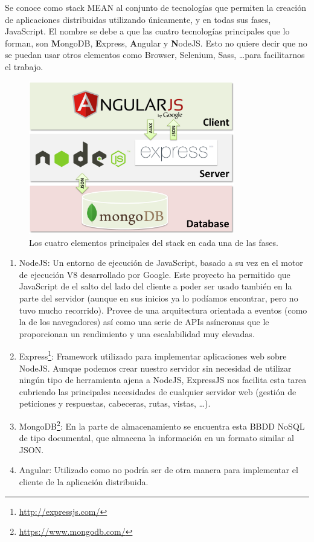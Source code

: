 Se conoce como stack \gls{MEAN} al conjunto de tecnologías que permiten la creación de aplicaciones distribuidas utilizando únicamente, y en todas sus fases, JavaScript. El nombre se debe a que las cuatro tecnologías principales que lo forman, son \textbf{M}ongoDB, \textbf{E}xpress, \textbf{A}ngular y \textbf{N}odeJS. Esto no quiere decir que no se puedan usar otros elementos como Browser, Selenium, Sass, \ldots para facilitarnos el trabajo.

\begin{figure}[H]
\centering
  \includegraphics[width=0.8\textwidth]{Figures/ch1/angular/mean}
  \caption{Los cuatro elementos principales del stack en cada una de las fases.}
\end{figure}

\begin{enumerate}
  \item NodeJS: Un entorno de ejecución de JavaScript, basado a su vez en el motor de ejecución V8 desarrollado por Google. Este proyecto ha permitido que JavaScript de el salto del lado del cliente a poder ser usado también en la parte del servidor (aunque en sus inicios ya lo podíamos encontrar, pero no tuvo mucho recorrido). Provee de una arquitectura orientada a eventos (como la de los navegadores) así como una serie de APIs asíncronas que le proporcionan un rendimiento y una escalabilidad muy elevadas.
  \item Express\footnote{\url{http://expressjs.com/}}: Framework utilizado para implementar aplicaciones web sobre NodeJS. Aunque podemos crear nuestro servidor sin necesidad de utilizar ningún tipo de herramienta ajena a NodeJS, ExpressJS nos facilita esta tarea cubriendo las principales necesidades de cualquier servidor web (gestión de peticiones y respuestas, cabeceras, rutas, vistas, \ldots).
  \item MongoDB\footnote{\url{https://www.mongodb.com/}}: En la parte de almacenamiento se encuentra esta \gls{BBDD} \gls{NoSQL} de tipo documental, que almacena la información en un formato similar al \gls{JSON}.
  \item Angular: Utilizado como no podría ser de otra manera para implementar el cliente de la aplicación distribuida.
\end{enumerate}

